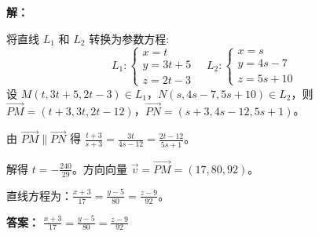 \begin{solution}

    \textbf{解：}

将直线 \(L_{1}\) 和 \(L_{2}\) 转换为参数方程:
\[
L_{1}:\begin{cases}x=t\\ y=3t+5\\ z=2t-3\end{cases} \quad
L_{2}:\begin{cases}x=s\\ y=4s-7\\ z=5s+10\end{cases}
\]
设 \(M(t, 3t+5, 2t-3) \in L_{1}\)，\(N(s, 4s-7, 5s+10) \in L_{2}\)，则 \( \overrightarrow{PM} = (t+3, 3t, 2t-12) \)，\( \overrightarrow{PN} = (s+3, 4s-12, 5s+1) \)。

由 \( \overrightarrow{PM} \parallel \overrightarrow{PN} \) 得 \( \frac{t+3}{s+3} = \frac{3t}{4s-12} = \frac{2t-12}{5s+1} \)。

解得 \( t = -\frac{240}{29} \)。方向向量 \( \vec{v} = \overrightarrow{PM} = (17, 80, 92) \)。

直线方程为：\( \frac{x + 3}{17} = \frac{y - 5}{80} = \frac{z - 9}{92} \)。

\textbf{答案：}  \( \frac{x + 3}{17} = \frac{y - 5}{80} = \frac{z - 9}{92} \)
\end{solution}